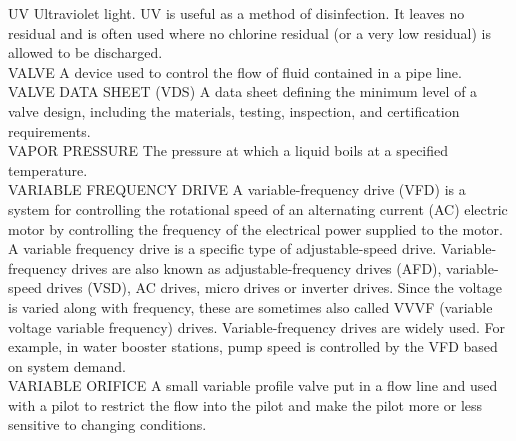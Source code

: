 UV
Ultraviolet light. UV is useful as a method of disinfection. It leaves no residual and is often used where no chlorine residual (or a very low residual) is allowed to be discharged.
\vspace{0.3cm}\\
VALVE
A device used to control the flow of fluid contained in a pipe line.
\vspace{0.3cm}\\
VALVE DATA SHEET (VDS)
A data sheet defining the minimum level of a valve design, including the materials, testing, inspection, and certification requirements.
\vspace{0.3cm}\\
VAPOR PRESSURE
The pressure at which a liquid boils at a specified temperature.
\vspace{0.3cm}\\
VARIABLE FREQUENCY DRIVE
A variable-frequency drive (VFD) is a system for controlling the rotational speed of an alternating current (AC) electric motor by controlling the frequency of the electrical power supplied to the motor. A variable frequency drive is a specific type of adjustable-speed drive. Variable-frequency drives are also known as adjustable-frequency drives (AFD), variable-speed drives (VSD), AC drives, micro drives or inverter drives. Since the voltage is varied along with frequency, these are sometimes also called VVVF (variable voltage variable frequency) drives. Variable-frequency drives are widely used. For example, in water booster stations, pump speed is controlled by the VFD based on system demand.
\vspace{0.3cm}\\
VARIABLE ORIFICE
A small variable profile valve put in a flow line and used with a pilot to restrict the flow into the pilot and make the pilot more or less sensitive to changing conditions.
\vspace{0.3cm}\\


